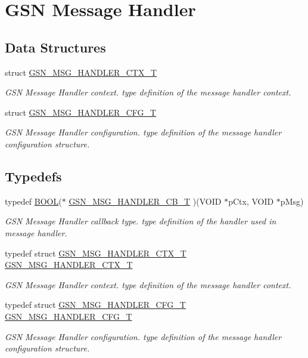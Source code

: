 \hypertarget{a00627}{
\section{GSN Message Handler}
\label{a00627}
}
\subsection*{Data Structures}
\begin{DoxyCompactItemize}
\item 
struct \hyperlink{a00155}{GSN\_\-MSG\_\-HANDLER\_\-CTX\_\-T}
\begin{DoxyCompactList}\small\item\em GSN Message Handler context. type definition of the message handler context. \end{DoxyCompactList}\item 
struct \hyperlink{a00154}{GSN\_\-MSG\_\-HANDLER\_\-CFG\_\-T}
\begin{DoxyCompactList}\small\item\em GSN Message Handler configuration. type definition of the message handler configuration structure. \end{DoxyCompactList}\end{DoxyCompactItemize}
\subsection*{Typedefs}
\begin{DoxyCompactItemize}
\item 
typedef \hyperlink{a00660_ga1f04022c0a182c51c059438790ea138c}{BOOL}($\ast$ \hyperlink{a00627_ga638c4ec452bde3b70fae3b7239e05cca}{GSN\_\-MSG\_\-HANDLER\_\-CB\_\-T} )(VOID $\ast$pCtx, VOID $\ast$pMsg)
\begin{DoxyCompactList}\small\item\em GSN Message Handler callback type. type definition of the handler used in message handler. \end{DoxyCompactList}\item 
typedef struct \hyperlink{a00155}{GSN\_\-MSG\_\-HANDLER\_\-CTX\_\-T} \hyperlink{a00627_gaf399ebe34f6e083a27eab240f852ac4d}{GSN\_\-MSG\_\-HANDLER\_\-CTX\_\-T}
\begin{DoxyCompactList}\small\item\em GSN Message Handler context. type definition of the message handler context. \end{DoxyCompactList}\item 
typedef struct \hyperlink{a00154}{GSN\_\-MSG\_\-HANDLER\_\-CFG\_\-T} \hyperlink{a00627_gafb3b653c75d46a7789b82f2f3aff8321}{GSN\_\-MSG\_\-HANDLER\_\-CFG\_\-T}
\begin{DoxyCompactList}\small\item\em GSN Message Handler configuration. type definition of the message handler configuration structure. \end{DoxyCompactList}\end{DoxyCompactItemize}
